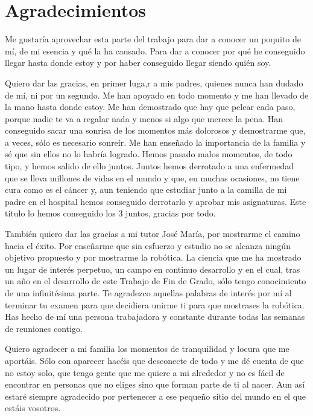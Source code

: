 \chapter*{Agradecimientos}
\setlength{\parskip}{1ex}

Me gustaría aprovechar esta parte del trabajo para dar a conocer un poquito de mí, de mi esencia y qué la ha causado. Para dar a conocer por qué he conseguido llegar hasta donde estoy y por haber conseguido llegar siendo quién soy.

Quiero dar las gracias, en primer luga,r a mis padres, quienes nunca han dudado de mí, ni por un segundo. Me han apoyado en todo momento y me han llevado de la mano hasta donde estoy. Me han demostrado que hay que pelear cada paso, porque nadie te va a regalar nada y menos si algo que merece la pena. Han conseguido sacar una sonrisa de los momentos más dolorosos y demostrarme que, a veces, sólo es necesario sonreír. Me han enseñado la importancia de la familia y sé que sin ellos no lo habría logrado. Hemos pasado malos momentos, de todo tipo, y hemos salido de ello juntos. Juntos hemos derrotado a una enfermedad que se lleva millones de vidas en el mundo y que, en muchas ocasiones, no tiene cura como es el cáncer y, aun teniendo que estudiar junto a la camilla de mi padre en el hospital hemos conseguido derrotarlo y aprobar mis asignaturas. Este título lo hemos conseguido los 3 juntos, gracias por todo.

También quiero dar las gracias a mi tutor José María, por mostrarme el camino hacia el éxito. Por enseñarme que sin esfuerzo y estudio no se alcanza ningún objetivo propuesto y por mostrarme la robótica. La ciencia que me ha mostrado un lugar de interés perpetuo, un campo en continuo desarrollo y en el cual, tras un año en el desarrollo de este Trabajo de Fin de Grado, sólo tengo conocimiento de una infinitésima parte. Te agradezco aquellas palabras de interés por mí al terminar tu examen para que decidiera unirme ti para que mostrases la robótica. Has hecho de mí una persona trabajadora y constante durante todas las semanas de reuniones contigo.

Quiero agradecer a mi familia los momentos de tranquilidad y locura que me aportáis. Sólo con aparecer hacéis que desconecte de todo y me dé cuenta de que no estoy solo, que tengo gente que me quiere a mi alrededor y no es fácil de encontrar en personas que no eliges sino que forman parte de ti al nacer. Aun así estaré siempre agradecido por pertenecer a ese pequeño sitio del mundo en el que estáis vosotros.

